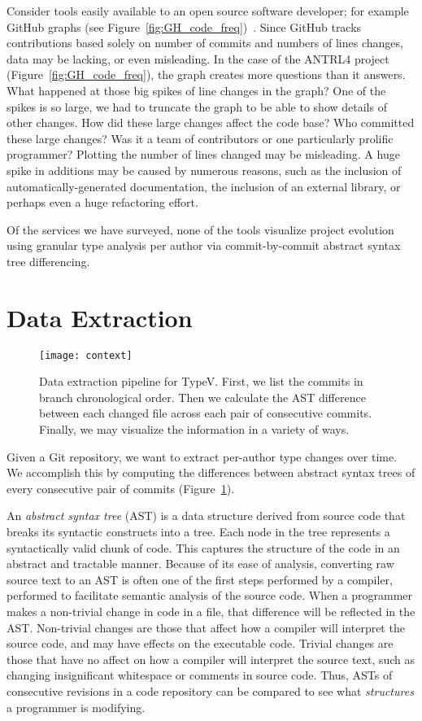 Consider tools easily available to an open source software developer; for example GitHub graphs (see Figure~\ref{fig:GH_code_freq})~\cite{github-graphs}. Since GitHub tracks contributions based solely on number of commits and numbers of lines changes, data may be lacking, or even misleading. In the case of the ANTRL4 project (Figure~\ref{fig:GH_code_freq}), the graph creates more questions than it answers. What happened at those big spikes of line changes in the graph? One of the spikes is so large, we had to truncate the graph to be able to show details of other changes. How did these large changes affect the code base? Who committed these large changes? Was it a team of contributors or one particularly prolific programmer? Plotting the number of lines changed may be misleading. A huge spike in additions may be caused by numerous reasons, such as the inclusion of automatically-generated documentation, the inclusion of an external library, or perhaps even a huge refactoring effort.

Of the services we have surveyed, none of the tools visualize project evolution using granular type analysis per author via commit-by-commit abstract syntax tree differencing. 

\section{Data Extraction}
\label{sec:methodology}

\begin{figure}[!h]
\centering
\texttt{[image: context]}
\caption{Data extraction pipeline for TypeV. First, we list the commits in branch chronological order. Then we calculate the AST difference between each changed file across each pair of consecutive commits. Finally, we may visualize the information in a variety of ways.}
\label{fig:context}
\end{figure}

Given a Git repository, we want to extract per-author type changes over time. We accomplish this by computing the differences between abstract syntax trees of every consecutive pair of commits (Figure~\ref{fig:context}).

An \emph{abstract syntax tree} (AST) is a data structure derived from source code that breaks its syntactic constructs into a tree. Each node in the tree represents a syntactically valid chunk of code. This captures the structure of the code in an abstract and tractable manner. Because of its ease of analysis, converting raw source text to an AST is often one of the first steps performed by a compiler, performed to facilitate semantic analysis of the source code. When a programmer makes a non-trivial change in code in a file, that difference will be reflected in the AST. Non-trivial changes are those that affect how a compiler will interpret the source code, and may have effects on the executable code. Trivial changes are those that have no affect on how a compiler will interpret the source text, such as changing insignificant whitespace or comments in source code. Thus, ASTs of consecutive revisions in a code repository can be compared to see what \emph{structures} a programmer is modifying.

